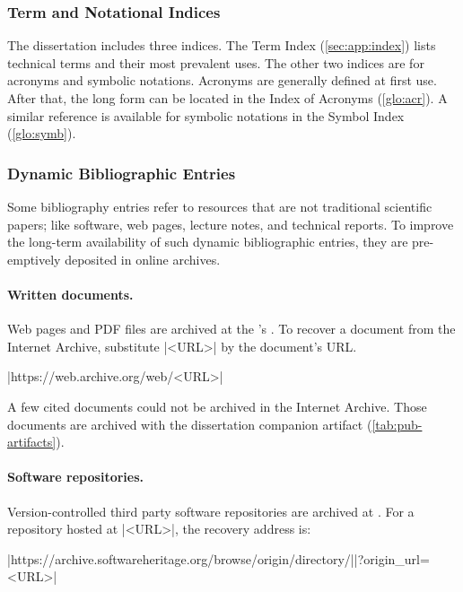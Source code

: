 \subsubsection{Term and Notational Indices}

The dissertation includes three indices.
The Term Index (\autoref{sec:app:index}) lists technical terms and their most prevalent uses.
The other two indices are for acronyms and symbolic notations.
Acronyms are generally defined at first use.
After that, the long form can be located in the Index of Acronyms (\autoref{glo:acr}).
A similar reference is available for symbolic notations in the Symbol Index (\autoref{glo:symb}).

\subsubsection{Dynamic Bibliographic Entries}

Some bibliography entries refer to resources that are not traditional scientific papers;
like software, web pages, lecture notes, and technical reports.
To improve the long-term availability of such dynamic bibliographic entries, they are pre-emptively deposited in online archives.

\paragraph*{Written documents.}
Web pages and PDF files are archived at the 's .
To recover a document from the Internet Archive, substitute \pr|<URL>| by the document's URL.
\begin{center}\pr|https://web.archive.org/web/<URL>|\end{center}
A few cited documents could not be archived in the Internet Archive.
Those documents are archived with the dissertation companion artifact (\autoref{tab:pub-artifacts}).

\paragraph*{Software repositories.}
Version-controlled third party software repositories are archived at
\href{https://softwareheritage.org}{}.
For a repository hosted at \pr|<URL>|, the recovery address is:%
\begin{center}\pr|https://archive.softwareheritage.org/browse/origin/directory/|\mbox{\pr|?origin_url=<URL>|}\end{center}

